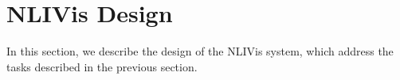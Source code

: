 
\section{NLIVis Design}
In this section, we describe the design of the NLIVis system, which address the tasks described in the previous section.


%

